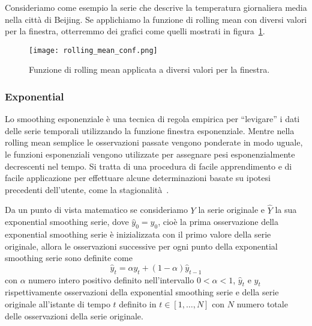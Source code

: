 \begin{esempio}
    Consideriamo come esempio la serie che descrive la temperatura giornaliera media
    nella città di Beijing. Se applichiamo la funzione di rolling mean con diversi
    valori per la finestra, otterremmo dei grafici come quelli mostrati in figura~\ref{fig:rolling_mean_conf}.
    
    \begin{figure}[H]
        \centering
        \texttt{[image: rolling\_mean\_conf.png]}
        \caption{Funzione di rolling mean applicata a diversi valori per la finestra.}
        \label{fig:rolling_mean_conf}
    \end{figure}

\end{esempio}




\subsubsection{Exponential}
Lo smoothing esponenziale è una tecnica di regola empirica 
per ``levigare'' i dati delle serie temporali utilizzando la funzione finestra esponenziale.
Mentre nella rolling mean semplice le osservazioni passate vengono ponderate 
in modo uguale, le funzioni esponenziali vengono utilizzate per assegnare 
pesi esponenzialmente decrescenti nel tempo. 
Si tratta di una procedura di facile apprendimento e di facile applicazione 
per effettuare alcune determinazioni basate su ipotesi precedenti dell'utente, 
come la stagionalità~\cite{wiki:exp_smot}.

Da un punto di vista matematico se consideriamo $Y$ la serie originale e $\hat{Y}$ la sua 
exponential smoothing serie, dove $\hat{y}_0 = y_0$, cioè la prima osservazione
della exponential smoothing serie è inizializzata con il primo valore della serie originale,
allora le osservazioni successive per ogni punto della exponential smoothing serie
sono definite come
\[ \hat{y}_t = \alpha y_t + (1 - \alpha)\hat{y}_{t-1}  \]
con $\alpha$ numero intero positivo definito nell'intervallo $0 < \alpha < 1$,  $\hat{y}_t$
e $y_t$ rispettivamente osservazioni della exponential smoothing serie e della serie originale
all'istante di tempo $t$ definito in $t \in [1, \dots , N]$ con $N$ numero totale delle osservazioni
della serie originale.

